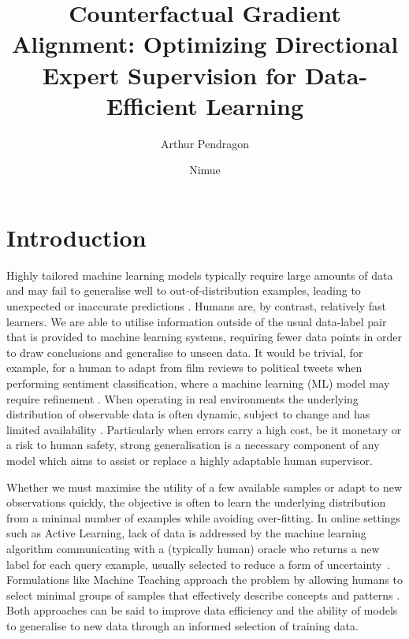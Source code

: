 \documentclass[sigconf,anonymous]{aamas}
\title[Counterfactual Gradient Alignment]{Counterfactual Gradient Alignment: Optimizing Directional Expert Supervision for Data-Efficient Learning}
\author{Arthur Pendragon}
\affiliation{
  \institution{Camelot Castle}
  \city{Camelot}
  \country{United Kingdom}}
\author{Nimue}
\affiliation{
  \institution{The Lady's Lake}
  \city{Avalon}
  \country{United Kingdom}}
\begin{document}
\pagestyle{fancy}
\fancyhead{}

\maketitle 

\section{Introduction}
Highly tailored machine learning models typically require large amounts of data and may fail to generalise well to out-of-distribution examples, leading to unexpected or inaccurate predictions \cite{hand_classifier, Challen231, souza2020challenges}. Humans are, by contrast, relatively fast learners. We are able to utilise information outside of the usual data-label pair that is provided to machine learning systems, requiring fewer data points in order to draw conclusions and generalise to unseen data. It would be trivial, for example, for a human to adapt from film reviews to political tweets when performing sentiment classification, where a machine learning (ML) model may require refinement \cite{blitzer-etal-2007-biographies}. When operating in real environments the underlying distribution of observable data is often dynamic, subject to change and has limited availability \cite{Sahiner2023}. Particularly when errors carry a high cost, be it monetary or a risk to human safety, strong generalisation is a necessary component of any model which aims to assist or replace a highly adaptable human supervisor.

Whether we must maximise the utility of a few available samples or adapt to new observations quickly, the objective is often to learn the underlying distribution from a minimal number of examples while avoiding over-fitting. In online settings such as Active Learning, lack of data is addressed by the machine learning algorithm communicating with a (typically human) oracle who returns a new label for each query example, usually selected to reduce a form of uncertainty~\cite{prince2004does}. Formulations like Machine Teaching approach the problem by allowing humans to select minimal groups of samples that effectively describe concepts and patterns \cite{Zhu2015}. Both approaches can be said to improve data efficiency and the ability of models to generalise to new data through an informed selection of training data.
\end{document}
